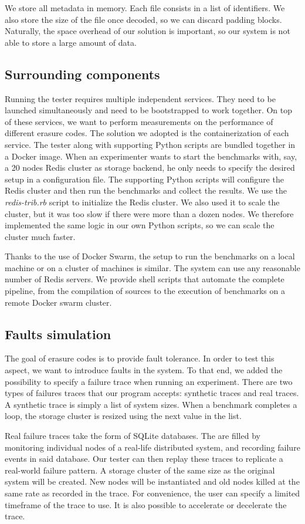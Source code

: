 We store all metadata in memory.
Each file consists in a list of identifiers.
We also store the size of the file once decoded, so we can discard padding blocks.
Naturally, the space overhead of our solution is important, so our system is not able to store a large amount of data.

\subsection{Surrounding components}

Running the tester requires multiple independent services.
They need to be launched simultaneously and need to be bootstrapped to work together.
On top of these services, we want to perform measurements on the performance of different erasure codes.
The solution we adopted is the containerization of each service.
The tester along with supporting Python scripts are bundled together in a Docker image.
When an experimenter wants to start the benchmarks with, say, a 20 nodes Redis cluster as storage backend, he only needs to specify the desired setup in a configuration file.
The supporting Python scripts will configure the Redis cluster and then run the benchmarks and collect the results.
We use the \textit{redis-trib.rb} script to initialize the Redis cluster.
We also used it to scale the cluster, but it was too slow if there were more than a dozen nodes.
We therefore implemented the same logic in our own Python scripts, so we can scale the cluster much faster.

Thanks to the use of Docker Swarm, the setup to run the benchmarks on a local machine or on a cluster of machines is similar.
The system can use any reasonable number of Redis servers.
We provide shell scripts that automate the complete pipeline, from the compilation of sources to the execution of benchmarks on a remote Docker swarm cluster.

\subsection{Faults simulation}

The goal of erasure codes is to provide fault tolerance.
In order to test this aspect, we want to introduce faults in the system.
To that end, we added the possibility to specify a failure trace when running an experiment.
There are two types of failures traces that our program accepts: synthetic traces and real traces.
A synthetic trace is simply a list of system sizes.
When a benchmark completes a loop, the storage cluster is resized using the next value in the list.

Real failure traces take the form of SQLite databases.
The are filled by monitoring individual nodes of a real-life distributed system, and recording failure events in said database.
Our tester can then replay these traces to replicate a real-world failure pattern.
A storage cluster of the same size as the original system will be created.
New nodes will be instantiated and old nodes killed at the same rate as recorded in the trace.
For convenience, the user can specify a limited timeframe of the trace to use.
It is also possible to accelerate or decelerate the trace.
